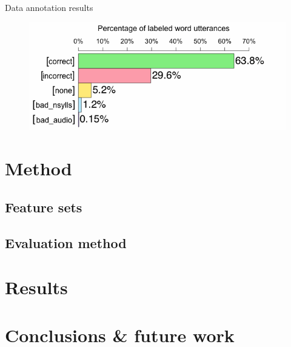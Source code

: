 \documentclass[xcolor={dvipsnames}]{beamer}
\begin{document}
\begin{frame}{Data annotation results}

	\begin{figure}
		\centering
		\includegraphics[width=\textwidth]{../overallJudgments-withLabels}
		\label{fig:results:overallbars}
	\end{figure}
\end{frame}

\section{Method}
\subsection{Feature sets}
\begin{frame}
\end{frame}
\subsection{Evaluation method}
\begin{frame}
\end{frame}

\section{Results}
\begin{frame}
\end{frame}
\begin{frame}
\end{frame}

\section{Conclusions \& future work}
\begin{frame}
\end{frame}
\end{document}
